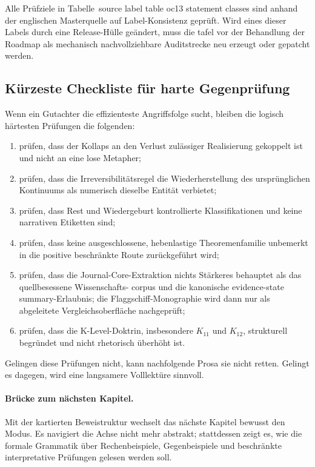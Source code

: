 Alle Prüfziele in Tabelle~source label table oc13 statement classes sind anhand der englischen Masterquelle
auf Label-Konsistenz geprüft. Wird eines dieser Labels durch eine Release-Hülle geändert, muss die
tafel vor der Behandlung der Roadmap als mechanisch nachvollziehbare Auditstrecke neu erzeugt oder
gepatcht werden.

\subsection{Kürzeste Checkliste für harte Gegenprüfung}

Wenn ein Gutachter die effizienteste Angriffsfolge sucht, bleiben die logisch härtesten Prüfungen
die folgenden:

\begin{enumerate}
\item prüfen, dass der Kollaps an den Verlust zulässiger Realisierung gekoppelt ist und nicht an eine lose Metapher;
\item prüfen, dass die Irreversibilitätsregel die Wiederherstellung des ursprünglichen Kontinuums als numerisch
      dieselbe Entität verbietet;
\item prüfen, dass Rest und Wiedergeburt kontrollierte Klassifikationen und keine narrativen Etiketten sind;
\item prüfen, dass keine ausgeschlossene, hebenlastige Theoremenfamilie unbemerkt in die positive beschränkte
      Route zurückgeführt wird;
\item prüfen, dass die Journal-Core-Extraktion nichts Stärkeres behauptet als das quellbesessene Wissenschafts-
      corpus und die kanonische evidence-state summary-Erlaubnis; die Flaggschiff-Monographie wird dann nur als abgeleitete
      Vergleichsoberfläche nachgeprüft;
\item prüfen, dass die K-Level-Doktrin, insbesondere \(K_{11}\) und \(K_{12}\), strukturell begründet und nicht
      rhetorisch überhöht ist.
\end{enumerate}

Gelingen diese Prüfungen nicht, kann nachfolgende Prosa sie nicht retten. Gelingt
es dagegen, wird eine langsamere Volllektüre sinnvoll.

\paragraph{Brücke zum nächsten Kapitel.}
Mit der kartierten Beweistruktur wechselt das nächste Kapitel bewusst den Modus. Es navigiert die Achse nicht
mehr abstrakt; stattdessen zeigt es, wie die formale Grammatik über Rechenbeispiele, Gegenbeispiele
und beschränkte interpretative Prüfungen gelesen werden soll.

\clearpage
